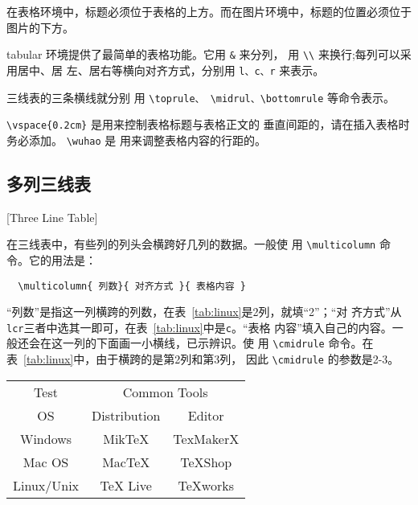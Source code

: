 在表格环境中，标题必须位于表格的上方。而在图片环境中，标题的位置必须位于
图片的下方。

tabular 环境提供了最简单的表格功能。它用 \texttt{\&} 来分列，
用 \texttt{\textbackslash{\textbackslash{}}} 来换行;每列可以采用居中、居
左、居右等横向对齐方式，分别用 \texttt{l、c、r} 来表示。

三线表的三条横线就分别
用 \verb|\toprule、 \midrul、\bottomrule| 等命令表示。

\verb|\vspace{0.2cm}| 是用来控制表格标题与表格正文的
垂直间距的，请在插入表格时务必添加。 \verb|\wuhao| 是
用来调整表格内容的行距的。


\subsection{多列三线表}[Three Line Table]

在三线表中，有些列的列头会横跨好几列的数据。一般使
用 \verb|\multicolumn| 命令。它的用法是：
\begin{lstlisting}
  \multicolumn{ 列数}{ 对齐方式 }{ 表格内容 }
\end{lstlisting}

“列数”是指这一列横跨的列数，在表~\ref{tab:linux}是2列，就填“2”；“对
齐方式”从\texttt{lcr}三者中选其一即可，在表~\ref{tab:linux}中是\texttt{c}。“表格
内容”填入自己的内容。一般还会在这一列的下面画一小横线，已示辨识。使
用 \verb|\cmidrule| 命令。在表~\ref{tab:linux}中，由于横跨的是第2列和第3列，
因此 \verb|\cmidrule| 的参数是2-3。

\begin{table}[htbp]
  \centering
  \vspace{0.2cm}
  \wuhao
  \begin{tabular}{ccc}
    \toprule
    Test    & \multicolumn{2}{c}{Common Tools} \\
              \cmidrule{2-3}
    OS         & Distribution & Editor  \\
    \midrule
    Windows    & MikTeX       & TexMakerX  \\
    Mac OS     & MacTeX       & TeXShop  \\
    Linux/Unix & TeX Live     & TeXworks  \\
    \bottomrule
  \end{tabular}
\end{table}


